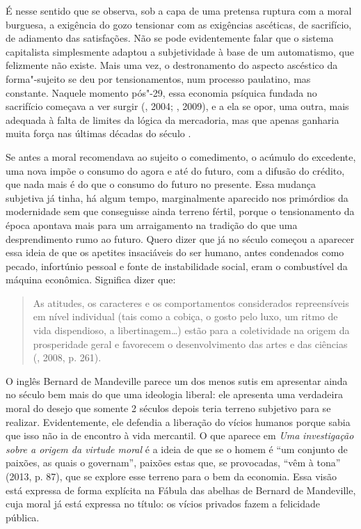 É nesse sentido que se observa, sob a capa de uma pretensa ruptura com a
moral burguesa, a exigência do gozo tensionar com as exigências
ascéticas, de sacrifício, de adiamento das satisfações. Não se pode
evidentemente falar que o sistema capitalista simplesmente adaptou a
subjetividade à base de um automatismo, que felizmente não existe. Mais
uma vez, o destronamento do aspecto ascéstico da forma"-sujeito se deu
por tensionamentos, num processo paulatino, mas constante. Naquele
momento pós"-29, essa economia psíquica fundada no sacrifício começava a
ver surgir (, 2004; , 2009), e a ela se opor, uma outra,
mais adequada à falta de limites da lógica da mercadoria, mas que apenas
ganharia muita força nas últimas décadas do século .

Se antes a moral recomendava ao sujeito o comedimento, o acúmulo do
excedente, uma nova impõe o consumo do agora e até do futuro, com a
difusão do crédito, que nada mais é do que o consumo do futuro no
presente. Essa mudança subjetiva já tinha, há algum tempo, marginalmente
aparecido nos primórdios da modernidade sem que conseguisse ainda
terreno fértil, porque o tensionamento da época apontava mais para um
arraigamento na tradição do que uma desprendimento rumo ao futuro. Quero
dizer que já no século  começou a aparecer essa ideia de que os
apetites insaciáveis do ser humano, antes condenados como pecado,
infortúnio pessoal e fonte de instabilidade social, eram o combustível
da máquina econômica. Significa dizer que:

\begin{quote}
As atitudes, os caracteres e os comportamentos considerados
repreensíveis em nível individual (tais como a cobiça, o gosto pelo
luxo, um ritmo de vida dispendioso, a libertinagem\ldots{}) estão para a
coletividade na origem da prosperidade geral e favorecem o
desenvolvimento das artes e das ciências (, 2008, p. 261).
\end{quote}

O inglês Bernard de Mandeville parece um dos menos sutis em apresentar
ainda no século  bem mais do que uma ideologia liberal: ele
apresenta uma verdadeira moral do desejo que somente 2 séculos depois
teria terreno subjetivo para se realizar. Evidentemente, ele defendia a
liberação do vícios humanos porque sabia que isso não ia de encontro à
vida mercantil. O que aparece em \emph{Uma} \emph{investigação sobre a
origem da virtude moral} é a ideia de que se o homem é ``um conjunto de
paixões, as quais o governam'', paixões estas que, se provocadas, ``vêm
à tona'' (2013, p. 87), que se explore esse terreno para o bem da
economia. Essa visão está expressa de forma explícita na Fábula das
abelhas de Bernard de Mandeville, cuja moral já está expressa no título:
os vícios privados fazem a felicidade pública.


